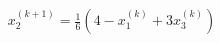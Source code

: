 \documentclass[preview]{standalone}
\begin{document}
\begin{align*}
x_2^{(k+1)} = \frac{1}{6}(4 - x_1^{(k)} + 3x_3^{(k)})
\end{align*}
\end{document}

